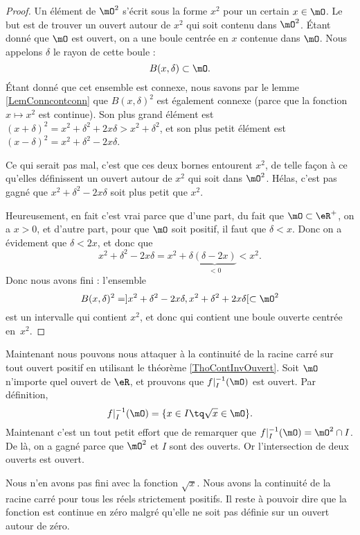 \begin{proof}
Un élément de $\mO^2$ s'écrit sous la forme $x^2$ pour un certain $x\in\mO$. Le but est de trouver un ouvert autour de $x^2$ qui soit contenu dans $\mO^2$. Étant donné que $\mO$ est ouvert, on a une boule centrée en $x$ contenue dans $\mO$. Nous appelons $\delta$ le rayon de cette boule :
\[ 
  B(x,\delta)\subset\mO.
\]
Étant donné que cet ensemble est connexe, nous savons par le lemme \ref{LemConncontconn} que $B(x,\delta)^2$ est également connexe (parce que la fonction $x\mapsto x^2$ est continue). Son plus grand élément est $(x+\delta)^2=x^2+\delta^2+2x\delta>x^2+\delta^2$, et son plus petit élément est $(x-\delta)^2=x^2+\delta^2-2x\delta$. 

Ce qui serait pas mal, c'est que ces deux bornes entourent $x^2$, de telle façon à ce qu'elles définissent un ouvert autour de $x^2$ qui soit dans $\mO^2$. Hélas, c'est pas gagné que $x^2+\delta^2-2x\delta$ soit plus petit que $x^2$. 

Heureusement, en fait c'est vrai parce que d'une part, du fait que $\mO\subset\eR^+$, on a $x>0$, et d'autre part, pour que $\mO$ soit positif, il faut que $\delta<x$. Donc on a évidement que $\delta<2x$, et donc que
\[ 
  x^2+\delta^2-2x\delta=x^2+\delta\underbrace{(\delta-2x)}_{<0}<x^2.
\]
Donc nous avons fini : l'ensemble
\[ 
  B(x,\delta)^2=]x^2+\delta^2-2x\delta,x^2+\delta^2+2x\delta[\subset\mO^2
\]
est un intervalle qui contient $x^2$, et donc qui contient une boule ouverte centrée en~$x^2$.

\end{proof}

Maintenant nous pouvons nous attaquer à la continuité de la racine carré sur tout ouvert positif en utilisant le théorème \ref{ThoContInvOuvert}. Soit $\mO$ n'importe quel ouvert de $\eR$, et prouvons que $f|_I^{-1}(\mO)$ est ouvert. Par définition,
\begin{equation}
  f|_I^{-1}(\mO)=\{ x\in I\tq \sqrt{x}\in\mO \}.
\end{equation}
Maintenant c'est un tout petit effort que de remarquer que $f|_I^{-1}(\mO)=\mO^2\cap I$. De là, on a gagné parce que $\mO^2$ et $I$ sont des ouverts. Or l'intersection de deux ouverts est ouvert. 

Nous n'en avons pas fini avec la fonction $\sqrt{x}$. Nous avons la continuité de la racine carré pour tous les réels strictement positifs. Il reste à pouvoir dire que la fonction est continue en zéro malgré qu'elle ne soit pas définie sur un ouvert autour de zéro. 

